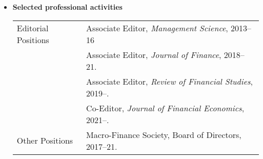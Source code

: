 \documentclass[11pt,letterpaper,serif,overlapped]{res}
\begin{document}
\begin{resume}
\begin{itemize}
\vspace{0.5cm}
\item \textbf{Selected professional activities} \\
\begin{longtable}{lp{11.5cm}}
Editorial Positions & Associate Editor, \emph{Management Science}, 2013--16\\
  &Associate Editor, \emph{Journal of Finance}, 2018--21.\\
  &Associate Editor, \emph{Review of Financial Studies}, 2019--.\\
  & Co-Editor, \emph{Journal of Financial Economics}, 2021--.\\[0.2cm]
Other Positions & Macro-Finance Society, Board of Directors, 2017--21.
\\
 \end{longtable}

 
\end{itemize}





\end{resume}
\end{document}
